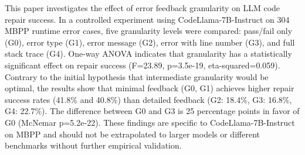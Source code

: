 
This paper investigates the effect of error feedback granularity on LLM code repair success. In a controlled experiment using CodeLlama-7B-Instruct on 304 MBPP runtime error cases, five granularity levels were compared: pass/fail only (G0), error type (G1), error message (G2), error with line number (G3), and full stack trace (G4). One-way ANOVA indicates that granularity has a statistically significant effect on repair success (F=23.89, p=3.5e-19, eta-squared=0.059). Contrary to the initial hypothesis that intermediate granularity would be optimal, the results show that minimal feedback (G0, G1) achieves higher repair success rates (41.8\% and 40.8\%) than detailed feedback (G2: 18.4\%, G3: 16.8\%, G4: 22.7\%). The difference between G0 and G3 is 25 percentage points in favor of G0 (McNemar p=5.2e-22). These findings are specific to CodeLlama-7B-Instruct on MBPP and should not be extrapolated to larger models or different benchmarks without further empirical validation.

